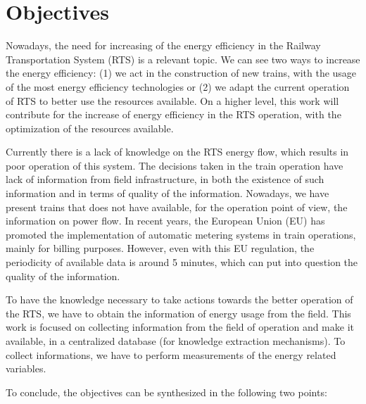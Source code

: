 

\section{Objectives}

Nowadays, the need for increasing of the energy efficiency in the Railway Transportation System (RTS) is a relevant topic.
We can see two ways to increase the energy efficiency: (1) we act in the construction of new trains, with the usage of the most energy efficiency technologies or (2) we adapt the current operation of RTS to better use the resources available.
On a higher level, this work will contribute for the increase of energy efficiency in the RTS operation, with the optimization of the resources available.

Currently there is a lack of knowledge on the RTS energy flow, which results in poor operation of this system. The decisions taken in the train operation have lack of information from field infrastructure, in both the existence of such information and in terms of quality of the information. Nowadays, we have present trains that does not have available, for the operation point of view, the information on power flow. In recent years, the European Union (EU) has promoted the implementation of automatic metering systems in train operations, mainly for billing purposes. However, even with this EU regulation, the periodicity of available data is around 5 minutes, which can put into question the quality of the information.

To have the knowledge necessary to take actions towards the better operation of the RTS, we have to obtain the information of energy usage from the field.
This work is focused on collecting information from the field of operation and make it available, in a centralized database (for knowledge extraction mechanisms). To collect informations, we have to perform measurements of the energy related variables.

To conclude, the objectives can be synthesized in the following two points:

